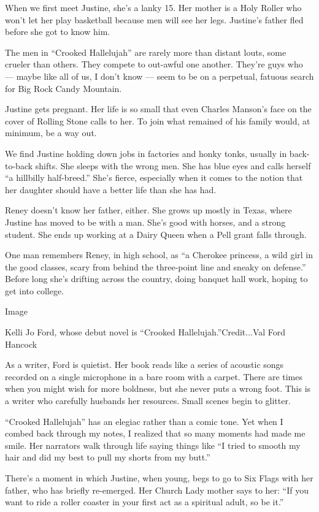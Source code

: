 When we first meet Justine, she's a lanky 15. Her mother is a Holy
Roller who won't let her play basketball because men will see her legs.
Justine's father fled before she got to know him.

The men in ``Crooked Hallelujah'' are rarely more than distant louts,
some crueler than others. They compete to out-awful one another. They're
guys who --- maybe like all of us, I don't know --- seem to be on a
perpetual, fatuous search for Big Rock Candy Mountain.

Justine gets pregnant. Her life is so small that even Charles Manson's
face on the cover of Rolling Stone calls to her. To join what remained
of his family would, at minimum, be a way out.

We find Justine holding down jobs in factories and honky tonks, usually
in back-to-back shifts. She sleeps with the wrong men. She has blue eyes
and calls herself ``a hillbilly half-breed.'' She's fierce, especially
when it comes to the notion that her daughter should have a better life
than she has had.

Reney doesn't know her father, either. She grows up mostly in Texas,
where Justine has moved to be with a man. She's good with horses, and a
strong student. She ends up working at a Dairy Queen when a Pell grant
falls through.

One man remembers Reney, in high school, as ``a Cherokee princess, a
wild girl in the good classes, scary from behind the three-point line
and sneaky on defense.'' Before long she's drifting across the country,
doing banquet hall work, hoping to get into college.

Image

Kelli Jo Ford, whose debut novel is ``Crooked Hallelujah.''Credit...Val
Ford Hancock

As a writer, Ford is quietist. Her book reads like a series of acoustic
songs recorded on a single microphone in a bare room with a carpet.
There are times when you might wish for more boldness, but she never
puts a wrong foot. This is a writer who carefully husbands her
resources. Small scenes begin to glitter.

``Crooked Hallelujah'' has an elegiac rather than a comic tone. Yet when
I combed back through my notes, I realized that so many moments had made
me smile. Her narrators walk through life saying things like ``I tried
to smooth my hair and did my best to pull my shorts from my butt.''

There's a moment in which Justine, when young, begs to go to Six Flags
with her father, who has briefly re-emerged. Her Church Lady mother says
to her: ``If you want to ride a roller coaster in your first act as a
spiritual adult, so be it.''

